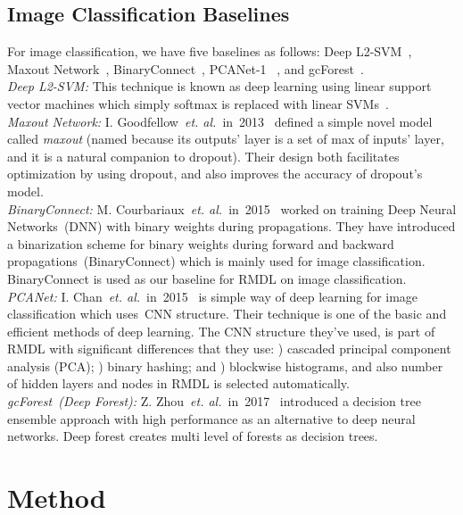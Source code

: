 \documentclass[sigconf, final]{acmart}
\begin{document}
\vspace{-0.1in}
\subsection{Image Classification Baselines}\label{subsec:baseline_image}
For image classification, we have five baselines as follows: Deep L2-SVM~\cite{tang2013deep}, Maxout Network~\cite{goodfellow2013maxout}, BinaryConnect~\cite{courbariaux2015binaryconnect}, PCANet-1 ~\cite{chan2015pcanet}, and gcForest~\cite{zhou2017deep}.\\
\textit{Deep L2-SVM:} This technique is known as deep learning using linear support vector machines which simply softmax is replaced with linear SVMs~\cite{tang2013deep}.
\\ \textit{Maxout Network:} I. Goodfellow~\textit{et. al.}~in~2013~\cite{goodfellow2013maxout} defined a simple novel model called \textit{maxout} (named because its outputs' layer is a set of max of inputs' layer, and it is a natural companion to dropout). Their design both facilitates optimization by using dropout, and also improves the accuracy of dropout's model.\\
\textit{BinaryConnect:} M. Courbariaux~\textit{et. al.}~in~2015~\cite{courbariaux2015binaryconnect} worked on training Deep Neural Networks~(DNN) with binary weights during propagations. They have introduced a binarization scheme for binary weights during forward and backward propagations~(\textup{BinaryConnect}) which is mainly used for image classification. BinaryConnect is used as our baseline for RMDL on image classification.\\ \textit{PCANet:} I. Chan~\textit{et. al.}~in~2015~\cite{chan2015pcanet} is simple way of deep learning for image classification which uses~CNN structure. Their technique is one of the basic and efficient methods of deep learning. The CNN structure they've used, is part of RMDL with significant differences that they use: ) cascaded principal component analysis (PCA); ) binary hashing; and  ) blockwise histograms, and also number of hidden layers and nodes in RMDL is selected automatically.\\ \textit{gcForest~(Deep Forest):} Z. Zhou~\textit{et. al.}~in~2017~\cite{zhou2017deep} introduced a decision tree ensemble approach with high performance as an alternative to deep neural networks. Deep forest creates multi level of forests as decision trees.  



\section{Method}\label{method}\label{sec:method}
\end{document}
